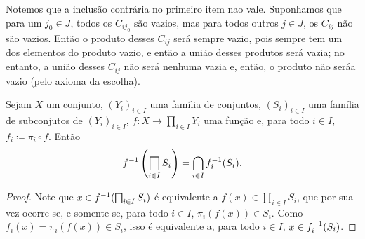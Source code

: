 Notemos que a inclusão contrária no primeiro item nao vale. Suponhamos que para um $j_0 \in J$, todos os $C_{ij_0}$ são vazios, mas para todos outros $j \in J$, os $C_{ij}$ não são vazios. Então o produto desses $C_{ij}$ será sempre vazio, pois sempre tem um dos elementos do produto vazio, e então a união desses produtos será vazia; no entanto, a união desses $C_{ij}$ não será nenhuma vazia e, então, o produto não seráa vazio (pelo axioma da escolha).

\begin{prop}
\label{conj:prop.im.inv.prod}
Sejam $X$ um conjunto, $(Y_i)_{i \in I}$ uma família de conjuntos, $(S_i)_{i \in I}$ uma família de subconjutos de $(Y_i)_{i \in I}$, $f: X \to \prod_{i \in I} Y_i$ uma função e, para todo $i \in I$, $f_i \coloneqq \pi_i \circ f$. Então
	\begin{equation*}
	f\inv\left( \prod_{i \in I} {S_i} \right) = \bigcap_{i \in I} f_i\inv (S_i).
	\end{equation*}
\end{prop}
\begin{proof}
Note que $x \in f\inv(\prod_{i \in I} {S_i})$ é equivalente a $f(x) \in \prod_{i \in I} {S_i}$, que por sua vez ocorre se, e somente se, para todo $i \in I$, $\pi_i(f(x)) \in S_i$. Como $f_i(x)=\pi_i(f(x)) \in S_i$, isso é equivalente a, para todo $i \in I$, $x \in f_i^{-1} (S_i)$.
\end{proof}










